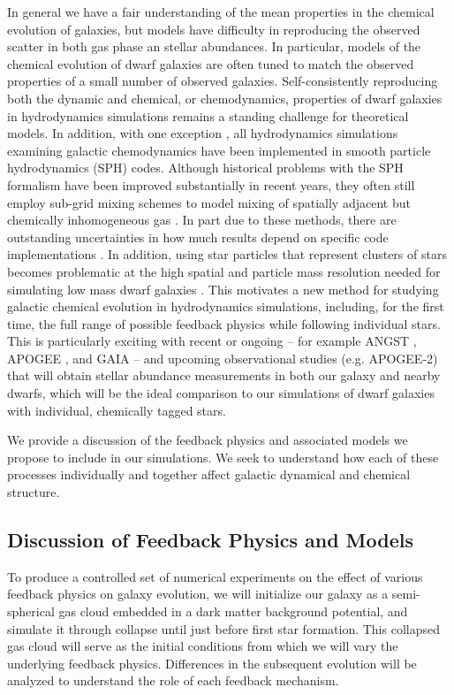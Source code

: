 \documentclass[11pt]{article}
\newcommand{\eg}{e.g.,}
\begin{document}
In general we have a fair understanding of the mean properties in the chemical evolution of galaxies, but models have difficulty in reproducing the observed scatter in both gas phase an stellar abundances. In particular, models of the chemical evolution of dwarf galaxies are often tuned to match the observed properties of a small number of observed galaxies. Self-consistently reproducing both the dynamic and chemical, or chemodynamics, properties of dwarf galaxies in hydrodynamics simulations remains a standing challenge for theoretical models. In addition, with one exception \citep{Few2012, Few2014}, all hydrodynamics simulations examining galactic chemodynamics have been implemented in smooth particle hydrodynamics (SPH) codes. Although historical problems with the SPH formalism have been improved substantially in recent years, they often still employ sub-grid mixing schemes to model mixing of spatially adjacent but chemically inhomogeneous gas \citep[\eg][]{ShenWadsleyStinson2010}. In part due to these methods, there are outstanding uncertainties in how much results depend on specific code implementations \citep{Revaz2016}. In addition, using star particles that represent clusters of stars becomes problematic at the high spatial and particle mass resolution needed for simulating low mass dwarf galaxies \citep{Revaz2016}. This motivates a new method for studying galactic chemical evolution in hydrodynamics simulations, including, for the first time, the full range of possible feedback physics while following individual stars. This is particularly exciting with recent or ongoing -- for example ANGST \citep{ANGST2009}, APOGEE \citep{APOGEE2010}, and GAIA -- and upcoming observational studies (e.g. APOGEE-2) that will obtain stellar abundance measurements in both our galaxy and nearby dwarfs, which will be the ideal comparison to our simulations of dwarf galaxies with individual, chemically tagged stars.

We provide a discussion of the feedback physics and associated models we propose to include in our simulations. We seek to understand how each of these processes individually and together affect galactic dynamical and chemical structure. 

\subsection{Discussion of Feedback Physics and Models}

To produce a controlled set of numerical experiments on the effect of various feedback physics on galaxy evolution, we will initialize our galaxy as a semi-spherical gas cloud embedded in a dark matter background potential, and simulate it through collapse until just before first star formation. This collapsed gas cloud will serve as the initial conditions from which we will vary the underlying feedback physics. Differences in the subsequent evolution will be analyzed to understand the role of each feedback mechanism. 
\end{document}
